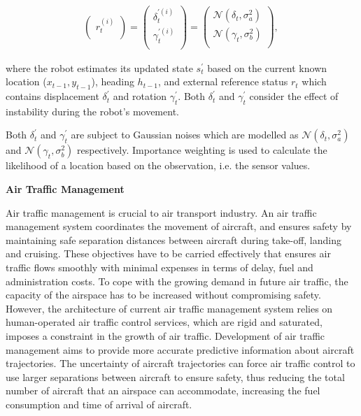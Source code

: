 \begin{equation}
\begin{aligned}
  \begin{pmatrix}
    r^{(i)}_t    \\ 
  \end{pmatrix}
  =
  \begin{pmatrix}
    \delta^{\prime(i)}_{t}    \\ 
    \gamma^{\prime(i)}_{t}    \\ 
  \end{pmatrix}
  =
  \begin{pmatrix}
  	\mathcal{N}(\delta_{t},\sigma_a^2) \\
		\mathcal{N}(\gamma_{t},\sigma_b^2) \\
  \end{pmatrix}
	\mbox{, }
\end{aligned}
\label{eq:mcl_r}
\end{equation}

where the robot estimates its updated state $s^{\prime}_t$ based on the current known location ($x_{t-1}, y_{t-1}$), heading $h_{t-1}$, and external reference status $r_t$ which contains displacement $\delta^{\prime}_t$ and rotation $\gamma^{\prime}_t$.
Both $\delta^{\prime}_t$ and $\gamma^{\prime}_t$ consider the effect of instability during the robot's movement.

Both $\delta^{\prime}_t$ and $\gamma^{\prime}_t$ are subject to Gaussian noises which are modelled as $\mathcal{N}(\delta_{t},\sigma_a^2)$ and $\mathcal{N}(\gamma_{t},\sigma_b^2)$ respectively.
Importance weighting is used to calculate the likelihood of a location based on the observation, i.e. the sensor values.

\textbf{Air Traffic Management}

Air traffic management is crucial to air transport industry.
An air traffic management system coordinates the movement of aircraft, and ensures safety by maintaining safe separation distances between aircraft during take-off, landing and cruising.
These objectives have to be carried effectively that ensures air traffic flows smoothly with minimal expenses in terms of delay, fuel and administration costs. 
To cope with the growing demand in future air traffic, the capacity of the airspace has to be increased without compromising safety.
However, the architecture of current air traffic management system relies on human-operated air traffic control services, which are rigid and saturated, imposes a constraint in the growth of air traffic.
Development of air traffic management aims to provide more accurate predictive information about aircraft trajectories.
The uncertainty of aircraft trajectories can force air traffic control to use larger separations between aircraft to ensure safety, thus reducing the total number of aircraft that an airspace can accommodate, increasing the fuel consumption and time of arrival of aircraft.

